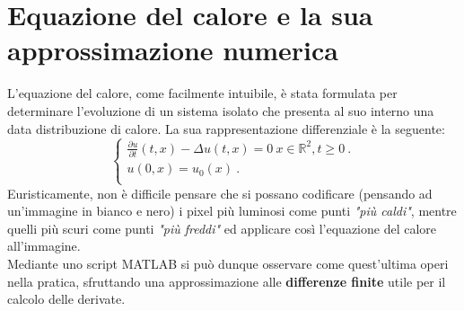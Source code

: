 \section{Equazione del calore e la sua approssimazione numerica}
L'equazione del calore, come facilmente intuibile, è stata formulata per determinare l'evoluzione di un sistema isolato che presenta al suo interno una data distribuzione di calore. La sua rappresentazione differenziale è la seguente:\\
$$
\begin{cases}
\frac{\partial u}{\partial t}(t,x)-\Delta u(t,x) = 0 \ x \in \mathbb R^2, t\ge 0 \ .\\ 
u(0,x) = u_0(x)\ . \\
\end{cases}
$$
Euristicamente, non è difficile pensare che si possano codificare (pensando ad un'immagine in bianco e nero) i pixel più luminosi come punti \textit{"più caldi"}, mentre quelli più scuri come punti \textit{"più freddi"} ed applicare così l'equazione del calore all'immagine.\\
Mediante uno script MATLAB si può dunque osservare come quest'ultima operi nella pratica, sfruttando una approssimazione alle \textbf{differenze finite } utile per il calcolo delle derivate.\\
\vspace{-0.5em}
